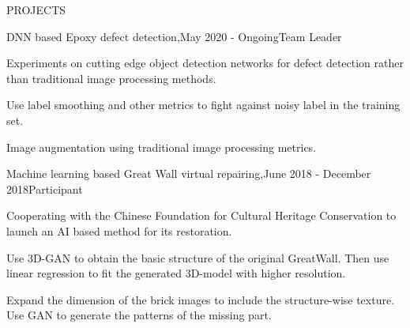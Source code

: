 \documentclass{resume} %
\begin{document}
\begin{rSection}{PROJECTS}
\begin{rSubsection}{DNN based Epoxy defect detection,}{May 2020 -  Ongoing}{Team Leader}{}
\item Experiments on cutting edge object detection networks for defect detection rather than traditional image processing methods.
\item Use label smoothing and other metrics to fight against noisy label in the training set.
\item Image augmentation using traditional image processing metrics.
\end{rSubsection}

\begin{rSubsection}{Machine learning based Great Wall virtual repairing,}{June 2018 - December 2018}{Participant}{}
\item Cooperating with the Chinese Foundation for Cultural Heritage Conservation to launch an AI based method for its restoration.
\item Use 3D-GAN to obtain the basic structure of the original GreatWall. Then use linear regression to fit the generated 3D-model with higher resolution.
\item Expand the dimension of the brick images to include the structure-wise texture. Use GAN to generate the patterns of the missing part.
\end{rSubsection}

\end{rSection} 
\end{document}
